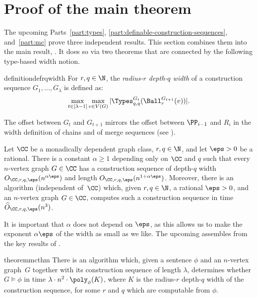 \section{Proof of the main theorem}\label{sec:main-proof}

The upcoming Parts~\ref{part:types}, \ref{part:definable-construction-sequences}, and~\ref{part:mc} prove three independent results.
This section combines them into the main result, . It does so via two theorems that are connected by the following type-based width notion.

\begin{restatable}{definition}{defrqwidth}\label{res:width}
For $r,q\in\N$,
the \emph{radius-$r$ depth-$q$ width}
of a construction sequence $G_1,\ldots,G_\lambda$
is defined as:
   $$\max_{t\in[\lambda-1]}\max_{v\in V(G)}|\Types^{G_t}_{q,q}({\Ball^{G_{t+1}}_r(v)})|.$$
  \end{restatable}

The offset between $G_t$ and $G_{t+1}$ mirrors the offset between $\PP_{i-1}$ and $R_i$ in the width definition of chains and of merge sequences (see ).

\begin{theorem}\label{thm:skel-few-types}
  Let $\CC$ be a monadically dependent graph class, $r,q\in\N$, and let $\eps>0$ be a rational.
  There is a constant $\alpha\ge1$ depending only on $\CC$ and $q$ such that every $n$-vertex graph $G\in\CC$
  has a construction sequence of  depth-$q$ width $O_{\CC,r,q,\eps}(n^{\alpha\eps})$ and length $O_{\CC,r,q,\eps}(n^{1+\alpha\eps})$.
  Moreover, there is an algorithm (independent of~$\CC$) which, given $r,q\in\N$, a rational $\eps>0$, and an $n$-vertex graph $G\in\CC$,
  computes such a construction sequence in time $\widehat O_{\CC,r,q,\eps}(n^3)$.
\end{theorem}
\noindent
It is important that $\alpha$ does not depend on $\eps$, as this allows us to make the exponent $\alpha\eps$ of the width as small as we like.
The upcoming  assembles  from the key results of
.

\newcommand{\mcdepth}{q}
\begin{restatable}{theorem}{mcthm}\label{thm:mc}
  There is an algorithm which, given
  a sentence $\phi$ and an $n$-vertex graph~$G$ together with its construction sequence of length $\lambda$, determines whether $G\models\phi$ in time
  $\lambda\cdot n^2\cdot\poly_{\phi}(K)$,
  where $K$ is the radius-$r$ depth-$\mcdepth$ width of the construction sequence,
  for some $r$ and $\mcdepth$ which are computable from $\phi$.
\end{restatable}

